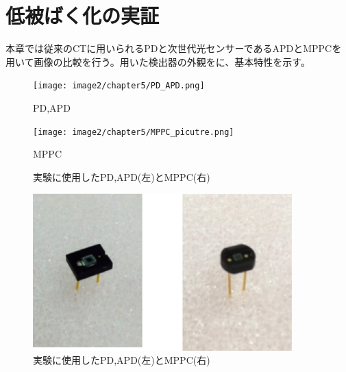 \chapter{低被ばく化の実証}


本章では従来のCTに用いられるPDと次世代光センサーであるAPDとMPPCを用いて画像の比較を行う。用いた検出器の外観をに、基本特性を示す。

\begin{figure}[H]
 \begin{minipage}{0.5\hsize}
  \begin{center}
   \texttt{[image: image2/chapter5/PD\_APD.png]} 
  \end{center}
  \vspace{-0.5cm}
  \caption*{PD,APD}
 \end{minipage}
 \begin{minipage}{0.5\hsize}
  \begin{center}
 \texttt{[image: image2/chapter5/MPPC\_picutre.png]} 
  \end{center}
  \vspace{-0.5cm}
  \caption*{MPPC}
 \end{minipage}
 \begin{center}
  \caption{実験に使用したPD,APD(左)とMPPC(右)}
  \label{fig:soshi}
  \end{center}
\end{figure}

\begin{figure}[H]
 \begin{center}
 \includegraphics[width=10cm]{image2/chapter5/apd_mppc.eps}
 \end{center}
 \caption{実験に使用したPD,APD(左)とMPPC(右)}
 \label{fig:Xray}
\end{figure}
\fi

